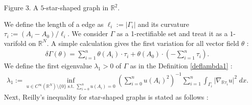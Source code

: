 \documentclass[12pt,english]{smfart} %
\theoremstyle{remark}
\begin{document}
\begin{center}
	Figure 3. A $5$-star-shaped graph in $\mathbb{R}^2$.
\end{center}

We define the length of a edge as $\ell_i := \vert \Gamma_i \vert$ and its curvature $\tau_i :=(A_i-A_0)/\ell_i$. We consider $\Gamma$ as a 1-rectifiable set and treat it as a $1$-varifold on $\mathbb{R}^N$. A simple calculation gives the first variation for all vector field $\theta$ :
\begin{align*}
	\delta \Gamma (\theta) = \sum_{i=1}^n \theta(A_i)\cdot \tau_i + \theta(A_0)\cdot \left( -\sum_{i=1}^n\tau_i\right).
\end{align*}
We define the first eigenvalue $\lambda_1>0$ of $\Gamma$ as in the Definition \ref{deflambda1} :
\begin{align*}
	\lambda_1:=\inf_{u \in C^\infty(\mathbb{R}^N) \setminus \{0\} \text{ s.t. } \sum_{i=0}^n u(A_i)=0} \left(\sum_{i=0}^nu(A_i)^2 \right)^{-1}\sum_{i=1}^n \int_{\Gamma_i}\vert \nabla_{\mathbb{R}\tau_i}u\vert^2 \; dx.
\end{align*}
Next, Reilly's inequality for star-shaped graphs is stated as follows :
\end{document}
